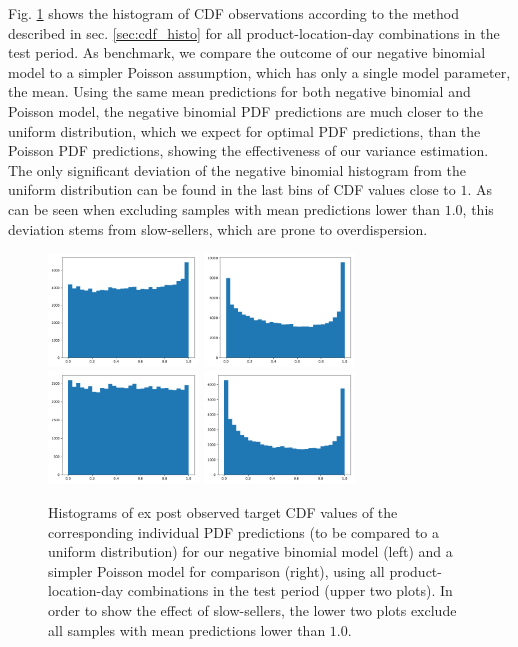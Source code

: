 \documentclass[BCOR=1mm, DIV=calc,10pt,
twoside=true,
twocolumn,
headings=normal]{scrartcl}
\newcommand{\fig}{Fig. }
\begin{document}
\fig \ref{fig:cdf_demand} shows the histogram of CDF observations according to the method described in sec. \ref{sec:cdf_histo} for all product-location-day combinations in the test period. As benchmark, we compare the outcome of our negative binomial model to a simpler Poisson assumption, which has only a single model parameter, the mean. Using the same mean predictions for both negative binomial and Poisson model, the negative binomial PDF predictions are much closer to the uniform distribution, which we expect for optimal PDF predictions, than the Poisson PDF predictions, showing the effectiveness of our variance estimation. The only significant deviation of the negative binomial histogram from the uniform distribution can be found in the last bins of CDF values close to $1$. As can be seen when excluding samples with mean predictions lower than $1.0$, this deviation stems from slow-sellers, which are prone to overdispersion.

\begin{figure}
\begin{center}
\includegraphics[width=4cm]{../figures/cdf_truth_nbinom}
\includegraphics[width=4cm]{../figures/cdf_truth_poisson}
\includegraphics[width=4cm]{../figures/cdf_truth_nbinom_larger1}
\includegraphics[width=4cm]{../figures/cdf_truth_poisson_larger1}
\caption{\label{fig:cdf_demand} Histograms of ex post observed target CDF values of the corresponding individual PDF predictions (to be compared to a uniform distribution) for our negative binomial model (left) and a simpler Poisson model for comparison (right), using all product-location-day combinations in the test period (upper two plots). In order to show the effect of slow-sellers, the lower two plots exclude all samples with mean predictions lower than $1.0$.}
\end{center}
\end{figure}
\end{document}
